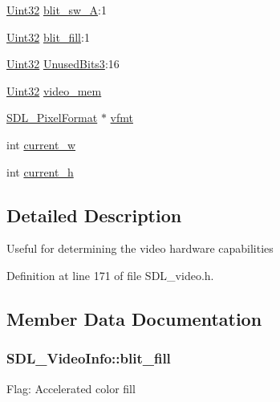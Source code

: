 \begin{DoxyCompactItemize}
\item 
\hyperlink{_s_d_l__stdinc_8h_add440eff171ea5f55cb00c4a9ab8672d}{Uint32} \hyperlink{struct_s_d_l___video_info_ad8319697999a5d00f551e2b7547f17aa}{blit\+\_\+sw\+\_\+\+A}\+:1
\item 
\hyperlink{_s_d_l__stdinc_8h_add440eff171ea5f55cb00c4a9ab8672d}{Uint32} \hyperlink{struct_s_d_l___video_info_ab0453880653b45226638e1ee34fceb56}{blit\+\_\+fill}\+:1
\item 
\hyperlink{_s_d_l__stdinc_8h_add440eff171ea5f55cb00c4a9ab8672d}{Uint32} \hyperlink{struct_s_d_l___video_info_a647dc6f87a620ac1f4d7075a0f7063c7}{Unused\+Bits3}\+:16
\item 
\hyperlink{_s_d_l__stdinc_8h_add440eff171ea5f55cb00c4a9ab8672d}{Uint32} \hyperlink{struct_s_d_l___video_info_ab706d6c856b170f8da28786e98fb5de3}{video\+\_\+mem}
\item 
\hyperlink{struct_s_d_l___pixel_format}{S\+D\+L\+\_\+\+Pixel\+Format} $\ast$ \hyperlink{struct_s_d_l___video_info_a8501500d288bda9c60d8251138478f08}{vfmt}
\item 
int \hyperlink{struct_s_d_l___video_info_add58e29175b54818092e9dea416fdc7f}{current\+\_\+w}
\item 
int \hyperlink{struct_s_d_l___video_info_ae797099dc83c35aa6fa9a157fee4c120}{current\+\_\+h}
\end{DoxyCompactItemize}


\subsection{Detailed Description}
Useful for determining the video hardware capabilities 

Definition at line 171 of file S\+D\+L\+\_\+video.\+h.



\subsection{Member Data Documentation}
\hypertarget{struct_s_d_l___video_info_ab0453880653b45226638e1ee34fceb56}{}
\subsubsection[{blit\+\_\+fill}]{ S\+D\+L\+\_\+\+Video\+Info\+::blit\+\_\+fill}\label{struct_s_d_l___video_info_ab0453880653b45226638e1ee34fceb56}
Flag\+: Accelerated color fill 

